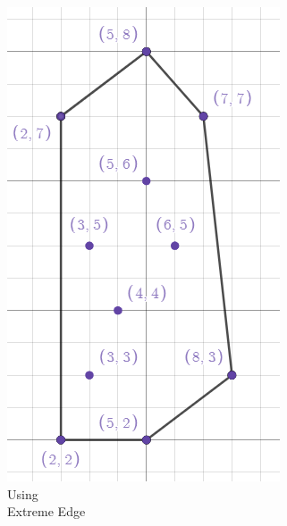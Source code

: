 \documentclass[a4paper,12pt]{article}
\begin{document}
\begin{figure}[h!]
\begin{subfigure}[b]{0.2\linewidth}
      \includegraphics[width=\linewidth]{cg_lab_4_output_extreme_edges.png}
      \caption{Using \\Extreme Edge}
    \end{subfigure}
    \hspace{1in}
    \begin{subfigure}[b]{0.2\linewidth}

\end{subfigure}
\end{figure}
\end{document}
